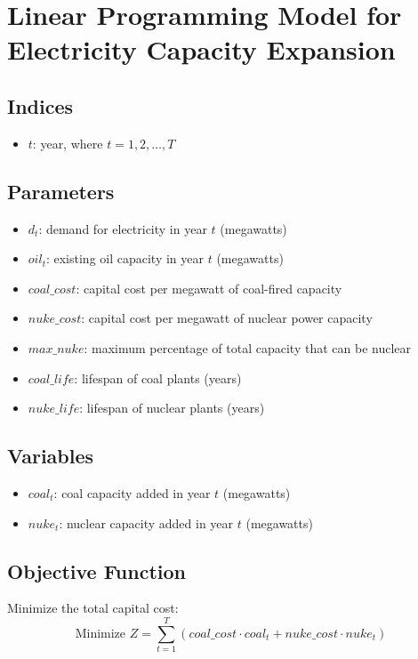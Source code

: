 \documentclass{article}
\begin{document}
\section*{Linear Programming Model for Electricity Capacity Expansion}

\subsection*{Indices}
\begin{itemize}
    \item \( t \): year, where \( t = 1, 2, \ldots, T \)
\end{itemize}

\subsection*{Parameters}
\begin{itemize}
    \item \( d_t \): demand for electricity in year \( t \) (megawatts)
    \item \( oil_t \): existing oil capacity in year \( t \) (megawatts)
    \item \( coal\_cost \): capital cost per megawatt of coal-fired capacity
    \item \( nuke\_cost \): capital cost per megawatt of nuclear power capacity
    \item \( max\_nuke \): maximum percentage of total capacity that can be nuclear
    \item \( coal\_life \): lifespan of coal plants (years)
    \item \( nuke\_life \): lifespan of nuclear plants (years)
\end{itemize}

\subsection*{Variables}
\begin{itemize}
    \item \( coal_t \): coal capacity added in year \( t \) (megawatts)
    \item \( nuke_t \): nuclear capacity added in year \( t \) (megawatts)
\end{itemize}

\subsection*{Objective Function}
Minimize the total capital cost:
\[
\text{Minimize } Z = \sum_{t=1}^{T} (coal\_cost \cdot coal_t + nuke\_cost \cdot nuke_t)
\]
\end{document}
